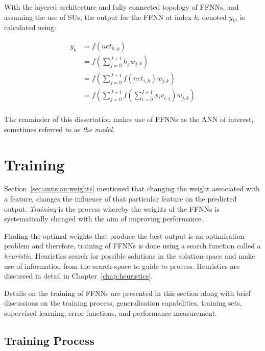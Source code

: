With the layered architecture and fully
connected topology of \acp{FFNN}, and assuming the use of \acp{SU}, the output
for the \ac{FFNN} at index $k$, denoted $y_k$, is calculated using:

\begin{equation}
    \label{eq:ffnn}
    \begin{split}
        y_k &= f\left(net_{h,y}\right) \\
            &= f\left(\sum_{j=0}^{J+1} h_j w_{j,k}\right) \\
            &= f\left(\sum_{j=0}^{J+1} f\left(net_{i,h}\right) w_{j,k}\right) \\
            &= f\left(\sum_{j=0}^{J+1} f\left(\sum_{i=0}^{I+1} x_i v_{i,j}\right) w_{j,k}\right) \\ 
    \end{split}
\end{equation}

\noindent The remainder of this dissertation makes use of \acp{FFNN} as the \ac{ANN}
of interest, sometimes referred to as \textit{the model}.


\section{Training}
\label{sec:anns:training}

Section~\ref{sec:anns:an:weights} mentioned that changing the weight associated
with a feature, changes the influence of that particular feature on the
predicted output. \textit{Training} is the process whereby the weights of the
\acp{FFNN} is systematically changed with the aim of improving performance.

Finding the optimal weights that produce the best output is an optimisation
problem and therefore, training of \acp{FFNN} is done using a search function
called a \textit{heuristic}. Heuristics search
for possible solutions in the solution-space and make use of information from
the search-space to guide to process. Heuristics are discussed in detail in
Chapter~\ref{chap:heuristics}.

Details on the training of \acp{FFNN} are presented in this section along with
brief discussions on the training process, generalisation capabilities, training
sets, supervised learning, error functions, and
performance measurement.

 
\subsection{Training Process}
\label{sec:anns:training:process}

